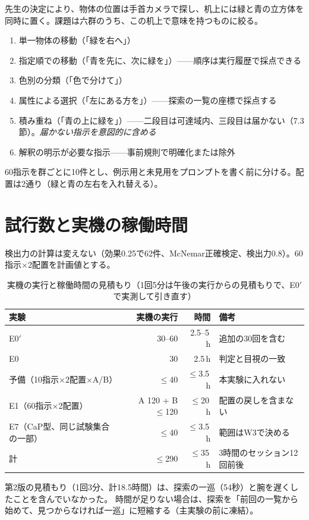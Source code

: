 \documentclass[11pt,a4paper]{article}
\begin{document}
先生の決定により、物体の位置は手首カメラで探し、机上には緑と青の立方体を同時に置く。課題は六群のうち、この机上で意味を持つものに絞る。
\begin{enumerate}
\item 単一物体の移動（「緑を右へ」）
\item 指定順での移動（「青を先に、次に緑を」）——順序は実行履歴で採点できる
\item 色別の分類（「色で分けて」）
\item 属性による選択（「左にある方を」）——探索の一覧の座標で採点する
\item 積み重ね（「青の上に緑を」）——二段目は可達域内、三段目は届かない（7.3節）。\emph{届かない指示を意図的に含める}
\item 解釈の明示が必要な指示——事前規則で明確化または除外
\end{enumerate}
\noindent 60指示を群ごとに10件とし、例示用と未見用をプロンプトを書く前に分ける。配置は2通り（緑と青の左右を入れ替える）。

\section{試行数と実機の稼働時間}

検出力の計算は変えない（効果0.25で62件、McNemar正確検定、検出力0.8）。60指示×2配置を計画値とする。

\begin{table}[h]\centering\small
\caption{実機の実行と稼働時間の見積もり（1回5分は午後の実行からの見積もりで、E0$'$で実測して引き直す）}
\begin{tabularx}{\textwidth}{@{}lrrY@{}}
\toprule
実験 & 実機の実行 & 時間 & 備考 \\
\midrule
E0$'$ & 30--60 & 2.5--5\,h & 追加の30回を含む \\
E0 & 30 & 2.5\,h & 判定と目視の一致 \\
予備（10指示×2配置×A/B） & $\le$40 & $\le$3.5\,h & 本実験に入れない \\
E1（60指示×2配置） & A 120 + B $\le$120 & $\le$20\,h & 配置の戻しを含まない \\
E7（CaP型、同じ試験集合の一部） & $\le$40 & $\le$3.5\,h & 範囲はW3で決める \\
\midrule
計 & $\le$290 & $\le$35\,h & 3時間のセッション12回前後 \\
\bottomrule
\end{tabularx}
\end{table}

\noindent 第2版の見積もり（1回3分、計18.5時間）は、探索の一巡（54秒）と腕を遅くしたことを含んでいなかった。
時間が足りない場合は、探索を「前回の一覧から始めて、見つからなければ一巡」に短縮する（主実験の前に凍結）。
\end{document}
